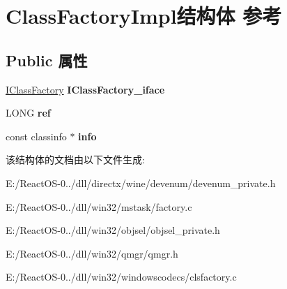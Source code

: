 \hypertarget{struct_class_factory_impl}{}\section{Class\+Factory\+Impl结构体 参考}
\label{struct_class_factory_impl}
\subsection*{Public 属性}
\begin{DoxyCompactItemize}
\item 
\mbox{\label{struct_class_factory_impl_a8ebe915494e6a15584e1460462ff91c6}} 
\hyperlink{interface_i_class_factory}{I\+Class\+Factory} {\bfseries I\+Class\+Factory\+\_\+iface}
\item 
\mbox{\label{struct_class_factory_impl_a6e6583f8cb2b0e1a5ab63e6fdf525788}} 
L\+O\+NG {\bfseries ref}
\item 
\mbox{\label{struct_class_factory_impl_af590c05f82922b50e266d11c66380bc8}} 
const classinfo $\ast$ {\bfseries info}
\end{DoxyCompactItemize}


该结构体的文档由以下文件生成\+:\begin{DoxyCompactItemize}
\item 
E\+:/\+React\+O\+S-\/0../dll/directx/wine/devenum/devenum\+\_\+private.\+h\item 
E\+:/\+React\+O\+S-\/0../dll/win32/mstask/factory.\+c\item 
E\+:/\+React\+O\+S-\/0../dll/win32/objsel/objsel\+\_\+private.\+h\item 
E\+:/\+React\+O\+S-\/0../dll/win32/qmgr/qmgr.\+h\item 
E\+:/\+React\+O\+S-\/0../dll/win32/windowscodecs/clsfactory.\+c\end{DoxyCompactItemize}
